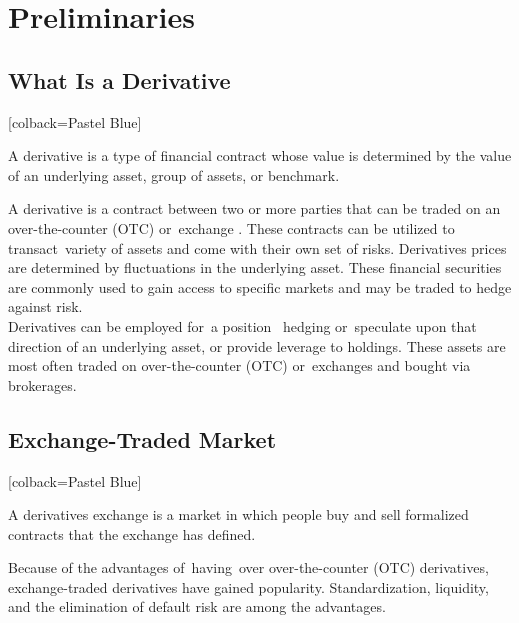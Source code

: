 \chapter{Preliminaries}

\label{ch: basics}
\section{What Is a Derivative}



\begin{tcolorbox}
	[colback=Pastel Blue]
	\begin{definition}
	A derivative is a type of financial contract whose value is determined by the value of an underlying asset, group of assets, or benchmark.
	\end{definition}
\end{tcolorbox}

 \noindent A derivative is a contract between two or more parties that can be traded on an over-the-counter (OTC) or exchange . These contracts can be utilized to transact variety of assets and come with their own set of risks. Derivatives prices are determined by fluctuations in the underlying asset. These financial securities are commonly used to gain access to specific markets and may be traded to hedge against risk. \\
 Derivatives can be employed for a position  hedging or speculate upon that direction of an underlying asset, or provide leverage to holdings. These assets are most often traded on over-the-counter (OTC) or exchanges and bought via brokerages. 

\section{Exchange-Traded Market}

\begin{tcolorbox}
	[colback=Pastel Blue]
	\begin{definition}
		A derivatives exchange is a market in which people buy and sell formalized contracts that the exchange has defined.
	\end{definition}
\end{tcolorbox}

 \noindent Because of the advantages of having over over-the-counter (OTC) derivatives, exchange-traded derivatives have gained popularity. Standardization, liquidity, and the elimination of default risk are among the advantages.\\
 
